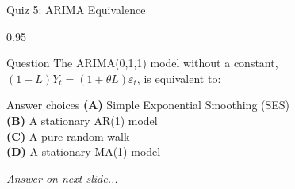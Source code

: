 \documentclass[9pt, aspectratio=169, t]{beamer}
\begin{document}
\begin{frame}{Quiz 5: ARIMA Equivalence}
    \begin{cminipage}{0.95\textwidth}
    \begin{alertblock}{Question}
        The ARIMA(0,1,1) model without a constant, $(1-L)Y_t = (1+\theta L)\varepsilon_t$, is equivalent to:
    \end{alertblock}

    \vspace{0.4cm}

    \begin{block}{Answer choices}
        \textcolor{MainBlue}{\textbf{(A)}} Simple Exponential Smoothing (SES)\\[3pt]
        \textcolor{MainBlue}{\textbf{(B)}} A stationary AR(1) model\\[3pt]
        \textcolor{MainBlue}{\textbf{(C)}} A pure random walk\\[3pt]
        \textcolor{MainBlue}{\textbf{(D)}} A stationary MA(1) model
    \end{block}

    \vspace{0.5cm}

    \begin{center}
        \textit{Answer on next slide...}
    \end{center}
    \end{cminipage}
\end{frame}
\end{document}
